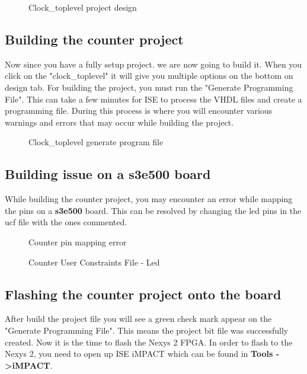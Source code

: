 \documentclass{article}
\begin{document}
\begin{figure}[!htb]
  \centering
  \caption{Clock\_toplevel project design}
\end{figure}

\subsection{Building the counter project}
Now since you have a fully setup project. we are now going to build it. When you click on the "clock\_toplevel" it will give you multiple options on the bottom on design tab. For building the project, you must run the "Generate Programming File". This can take a few minutes for ISE to process the VHDL files and create a programming file. During this process is where you will encounter various warnings and errors that may occur while building the project.

\begin{figure}[!htb]
  \centering
  \caption{Clock\_toplevel generate program file}
\end{figure}

\subsection{Building issue on a s3e500 board}
While building the counter project, you may encounter an error while mapping the pins on a \textbf{s3e500} board. This can be resolved by changing the led pins in the ucf file with the ones commented.

\begin{figure}[!htb]
  \centering
  \caption{Counter pin mapping error}
\end{figure}

\begin{figure}[!htb]
  \centering
  \caption{Counter User Constraints File - Led}
\end{figure}

\subsection{Flashing the counter project onto the board}
After build the project file you will see a green check mark appear on the "Generate Programming File". This means the project bit file was successfully created. Now it is the time to flash the Nexys 2 FPGA. In order to flash to the Nexys 2, you need to open up ISE iMPACT which can be found in \textbf{Tools -\textgreater iMPACT}.
\end{document}
